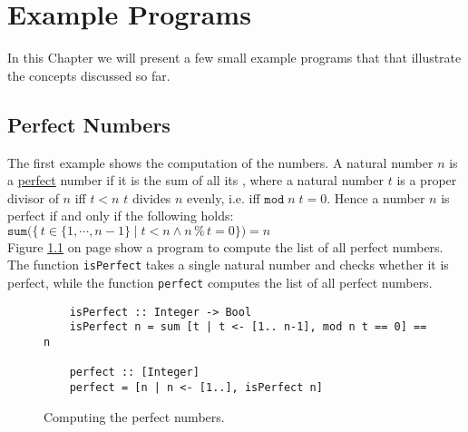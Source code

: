 \chapter{Example Programs}
In this Chapter we will present a few small example programs that that illustrate the concepts discussed so far.

\section{Perfect Numbers}
The first example shows the computation of the  numbers.  A natural number $n$ is a
\href{https://en.wikipedia.org/wiki/Perfect_number}{perfect} number if it is the sum of all its ,
where a natural number $t$ is a proper divisor of $n$ iff $t < n$ $t$ divides $n$ evenly, i.e. iff
$\texttt{mod}\; n\; t = 0$.  Hence a number $n$ is perfect if and only if the following holds:
\\[0.2cm]
\hspace*{1.3cm}
$\mathtt{sum}\bigl(\{\,t \in \{1,\cdots,n-1\} \;\big|\; t < n \wedge n \,\texttt{\%}\, t = 0 \}\bigr) = n$
\\[0.2cm]
Figure \ref{fig:perfect.hs} on page \pageref{fig:perfect.hs} show a program to compute the list of all perfect
numbers.  The function \texttt{isPerfect} takes a single natural number and checks whether it is perfect, while
the function \texttt{perfect} computes the list of all perfect numbers.

\begin{figure}[!ht]
\centering
\begin{verbatim}
    isPerfect :: Integer -> Bool
    isPerfect n = sum [t | t <- [1.. n-1], mod n t == 0] == n
    
    perfect :: [Integer]
    perfect = [n | n <- [1..], isPerfect n]
\end{verbatim}
\vspace*{-0.3cm}
\caption{Computing the perfect numbers.}
\label{fig:perfect.hs}
\end{figure}

